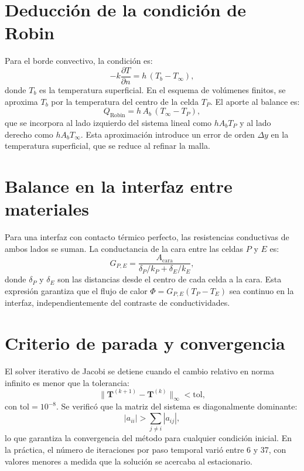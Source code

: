 \documentclass[11pt,a4paper]{article}
\begin{document}
\section{Deducción de la condición de Robin}

Para el borde convectivo, la condición es:
\begin{equation}
-k \frac{\partial T}{\partial n} = h\,(T_b - T_\infty),
\end{equation}
donde $T_b$ es la temperatura superficial. En el esquema de volúmenes finitos, se aproxima $T_b$ por la temperatura del centro de la celda $T_P$. El aporte al balance es:
\begin{equation}
Q_{\text{Robin}} = h\,A_b\,(T_\infty - T_P),
\end{equation}
que se incorpora al lado izquierdo del sistema lineal como $h A_b T_P$ y al lado derecho como $h A_b T_\infty$. Esta aproximación introduce un error de orden $\Delta y$ en la temperatura superficial, que se reduce al refinar la malla.

\section{Balance en la interfaz entre materiales}

Para una interfaz con contacto térmico perfecto, las resistencias conductivas de ambos lados se suman. La conductancia de la cara entre las celdas $P$ y $E$ es:
\begin{equation}
G_{P,E} = \frac{A_{\text{cara}}}{\delta_P/k_P + \delta_E/k_E},
\end{equation}
donde $\delta_P$ y $\delta_E$ son las distancias desde el centro de cada celda a la cara. Esta expresión garantiza que el flujo de calor $\Phi = G_{P,E}(T_P - T_E)$ sea continuo en la interfaz, independientemente del contraste de conductividades.

\section{Criterio de parada y convergencia}

El solver iterativo de Jacobi se detiene cuando el cambio relativo en norma infinito es menor que la tolerancia:
\begin{equation}
\|\mathbf{T}^{(k+1)} - \mathbf{T}^{(k)}\|_\infty < \text{tol},
\end{equation}
con $\text{tol}=10^{-8}$. Se verificó que la matriz del sistema es diagonalmente dominante:
\begin{equation}
|a_{ii}| > \sum_{j\neq i} |a_{ij}|,
\end{equation}
lo que garantiza la convergencia del método para cualquier condición inicial. En la práctica, el número de iteraciones por paso temporal varió entre 6 y 37, con valores menores a medida que la solución se acercaba al estacionario.
\end{document}
